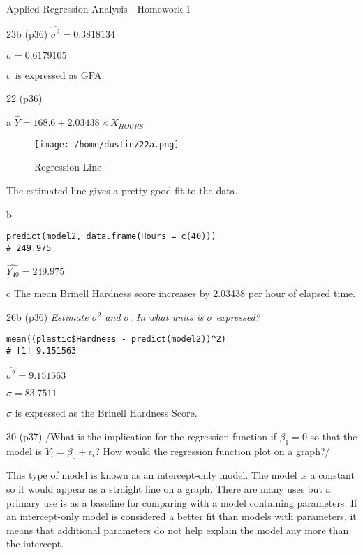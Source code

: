 \documentclass[11pt]{article}
\begin{document}
\begin{frame}[label={sec:orgb1fb7b8},fragile]{Applied Regression Analysis - Homework 1}
\begin{block}{23b (p36)}
\(\hat{\sigma^2} = 0.3818134\)

\(\hat{\sigma} = 0.6179105\)

\(\sigma\) is expressed as GPA.
\end{block}

\begin{block}{22 (p36)}
\begin{block}{a}
\(\hat{Y} = 168.6 + 2.03438 \times X_{HOURS}\)
\begin{figure}[htbp]
\centering
\texttt{[image: /home/dustin/22a.png]}
\caption{\label{fig:org0de7e37}
Regression Line}
\end{figure}

The estimated line gives a pretty good fit to the data.
\end{block}
\begin{block}{b}
\begin{verbatim}
predict(model2, data.frame(Hours = c(40)))
# 249.975
\end{verbatim}

\(\hat{Y_{40}} = 249.975\)
\end{block}

\begin{block}{c}
The mean Brinell Hardness score increases by 2.03438 per hour of elapsed time.
\end{block}
\end{block}

\begin{block}{26b (p36)}
\emph{Estimate \(\sigma^2\) and \(\sigma\). In what units is \(\sigma\) expressed?}

\begin{verbatim}
mean((plastic$Hardness - predict(model2))^2)
# [1] 9.151563
\end{verbatim}

\(\hat{\sigma^2} = 9.151563\)

\(\hat{\sigma} = 83.7511\)

\(\sigma\) is expressed as the Brinell Hardness Score.
\end{block}

\begin{block}{30 (p37)}
/What is the implication for the regression function if \(\beta_1 = 0\) so that
the model is \(Y_i = \beta_0 + \epsilon_i\)? How would the regression function
plot on a graph?/

This type of model is known as an intercept-only model. The model is a constant
so it would appear as a straight line on a graph. There are many uses
but a primary use is as a baseline for comparing with a model containing
parameters. If an intercept-only model is considered a better fit than models
with parameters, it means that additional parameters do not help explain the
model any more than the intercept.
\end{block}


\end{frame}
\end{document}
